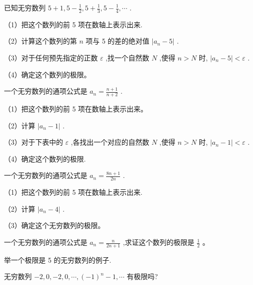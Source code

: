 \documentclass[lang=cn,newtx,10pt,scheme=chinese]{elegantbook}
\begin{document}
\begin{problemset}[习题一]
	\item 已知无穷数列 \(5 + 1,5 - \frac{1}{2},5 + \frac{1}{3},5 - \frac{1}{4},\cdots\) .
	
	（1）把这个数列的前 5 项在数轴上表示出来.
	
	（2）计算这个数列的第 \(n\) 项与 5 的差的绝对值 \(\left| {{a}_{n} - 5}\right|\) .
	
	（3）对于任何预先指定的正数 \(\varepsilon\) ,找一个自然数 \(N\) ,使得 \(n > N\) 时, \(\left| {{a}_{n} - 5}\right| < \varepsilon\) .
	
	（4）确定这个数列的极限。
	
	\item 一个无穷数列的通项公式是 \({a}_{n} = \frac{n + 1}{n + 2}\) .
	
	（1）把这个数列的前 5 项在数轴上表示出来。
	
	（2）计算 \(\left| {{a}_{n} - 1}\right|\) .
	
	（3）对于下表中的 \(\varepsilon\) ,各找出一个对应的自然数 \(N\) ,使得 \(n > N\) 时, \(\left| {{a}_{n} - 1}\right| < \varepsilon\) .
	
	\begin{center}
	\end{center}
	
	（4）确定这个数列的极限.
	
	\item 一个无穷数列的通项公式是 \({a}_{n} = \frac{{8n} + 1}{2n}\) .
	
	（1）把这个数列的前 5 项在数轴上表示出来.
	
	（2）计算 \(\left| {{a}_{n} - 4}\right|\) .
	
	（3）确定这个无穷数列的极限。
	
	\item 一个无穷数列的通项公式是 \({a}_{n} = \frac{n}{{2n} + 1}\) ,求证这个数列的极限是 \(\frac{1}{2}\) 。
	
	\item 举一个极限是 5 的无穷数列的例子.
	
	\item 无穷数列 \(- 2,0, - 2,0,\cdots ,{\left( -1\right) }^{n} - 1,\cdots\) 有极限吗?
	

\end{problemset}
\end{document}
